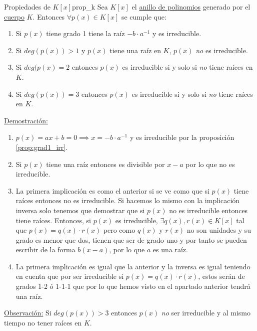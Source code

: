 \documentclass[10pt, a4paper]{article}
\newcommand{\obs}{\underline{Observación:} }
\newcommand{\demo}{\underline{Demostración:} }
\newcommand{\cuerpo}[1][]{\hyperref[def:cuerpo]{cuerpo}#1 }
\begin{document}
\begin{proposition}{Propiedades de $K[x]$}{prop_k}
Sea $K[x]$ el \hyperref[def:anillo_poli]{anillo de polinomios} generado por el \cuerpo $K$. Entonces $\forall p(x) \in K[x]$ se cumple que:

\begin{enumerate}
	\item Si $p(x)$ tiene grado 1 tiene la raíz $-b \cdot a^{-1}$ y es irreducible.
	\item Si $deg(p(x)) > 1$ y $p(x)$ tiene una raíz en $K$, $p(x)$ \emph{no} es irreducible.
	\item Si $deg(p(x) = 2$ entonces $p(x)$ es irreducible si y solo si \emph{no} tiene raíces en $K$.
	\item Si $deg(p(x)) = 3$ entonces $p(x)$ es irreducible si y solo si \emph{no} tiene raíces en $K$.
\end{enumerate}
\end{proposition}

\demo 
\begin{enumerate}
	\item $p(x) = ax + b = 0 \implies x = -b \cdot a^{-1}$ y es irreducible por la proposición \ref{prop:grad1_irr}.
	\item Si $p(x)$ tiene una raíz entonces es divisible por $x - a$ por lo que no es irreducible.
	\item La primera implicación es como el anterior si se ve como que si $p(x)$ tiene raíces entonces no es irreducible. Si hacemos lo mismo con la implicación inversa solo tenemos que demostrar que si $p(x)$ no es irreducible entonces tiene raíces. Entonces, si $p(x)$ es irreducible, $\exists q(x), r(x) \in K[x]$ tal que $p(x) = q(x) \cdot r(x)$ pero como $q(x)$ y $r(x)$ no son unidades y su grado es menor que dos, tienen que ser de grado uno y por tanto se pueden escribir de la forma $b(x - a)$, por lo que $a$ es una raíz.
	\item La primera implicación es igual que la anterior y la inversa es igual teniendo en cuenta que por ser irreducible si $p(x) = q(x) \cdot r(x)$, estos serán de grados 1-2 ó 1-1-1 que por lo que hemos visto en el apartado anterior tendrá una raíz.
\end{enumerate}

\vspace{3mm}

\obs Si $deg(p(x)) > 3$ entonces $p(x)$ \emph{no} ser irreducible y al mismo tiempo no tener raíces en $K$.

\vspace{3mm}
\end{document}
